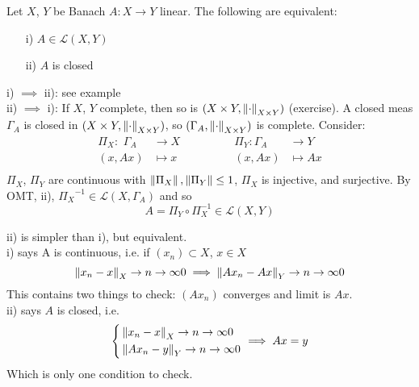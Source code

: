 \documentclass{article}
\begin{document}
\begin{theorem}\nl
Let $X$, $Y$ be Banach $A:X\to Y$ linear. The following are equivalent:
\begin{itemize}
    \item [i)] $A\in\mathcal{L}(X,Y)$
    \item [ii)] $A$ is closed
\end{itemize} 
\begin{pf}{}{}
    i) $\implies$ ii): see example\\
    ii) $\implies$ i): If $X$, $Y$ complete, then so is $(X\times Y,\left\|{\cdot}\right\|_{X\times Y})$ (exercise). A closed meas $\Gamma_A$ is closed in $(X\times Y,\left\|{\cdot}\right\|_{X\times Y})$, so $(\Gamma_A,\left\|{\cdot}\right\|_{X\times Y})$ is complete. Consider:
    \begin{equation}
        \begin{aligned}
            \Pi_X:\,\,\Gamma_A&\to X \qquad\qquad& \Pi_Y:\Gamma_A&\to Y\\
        (x,Ax)&\mapsto x  & (x,Ax)&\mapsto Ax\\
        \end{aligned}    
    \end{equation}
$\Pi_X$, $\Pi_Y$ are continuous with $\left\|{\Pi_X}\right\|,\left\|{\Pi_Y}\right\|\leq 1$, $\Pi_X$ is injective, and surjective. By OMT, ii), ${\Pi_X}^{-1}\in\mathcal{L}{(X,\Gamma_A)}$ and so
$$
A=\Pi_Y\circ \Pi_X^{-1}\in\mathcal{L}(X,Y)
$$
\end{pf}
\end{theorem}

\begin{remark}
	ii) is simpler than i), but equivalent.\\
	i) says A is continuous, i.e. if $(x_n)\subset X$, $x\in X$
	$$\left\|{x_n-x}\right\|_X\rightarrow{n\to\infty}0\implies\left\|{Ax_n-Ax}\right\|_Y\rightarrow{n\to\infty}0$$
	This contains two things to check: $(Ax_n)$ converges and limit is $Ax$.\\
	ii) says $A$ is closed, i.e.
	\begin{equation}
		\left\{
		\begin{aligned}
			&\left\|{x_n-x}\right\|_X\rightarrow{n\to\infty}0\\
			&\left\|{Ax_n-y}\right\|_Y\rightarrow{n\to\infty}0\\
		\end{aligned}
		\right.\implies
		Ax=y
	\end{equation}
	Which is only one condition to check.
\end{remark}
\end{document}
